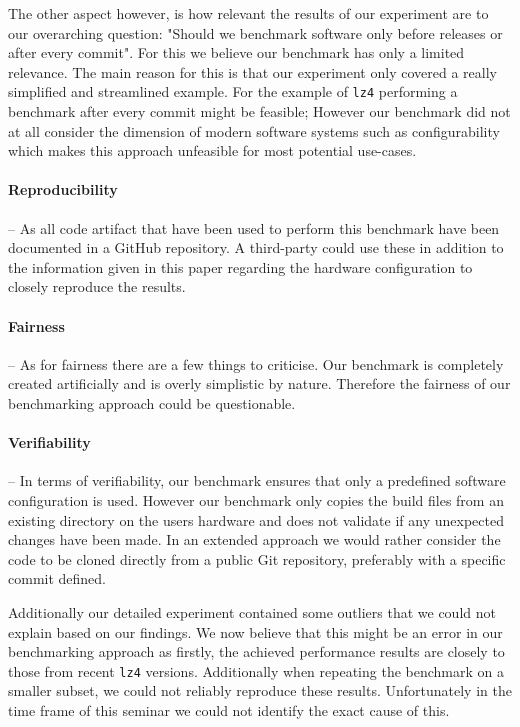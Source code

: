 \documentclass[	runningheads,
				a4paper]{llncs}
\begin{document}
	The other aspect however, is how relevant the results of our experiment are to our overarching question: "Should we benchmark software only before releases or after every commit". For this we believe our benchmark has only a limited relevance. The main reason for this is that our experiment only covered a really simplified and streamlined example. For the example of \texttt{lz4} performing a benchmark after every commit might be feasible; However our benchmark did not at all consider the dimension of modern software systems such as configurability which makes this approach unfeasible for most potential use-cases.

\paragraph{Reproducibility} -- As all code artifact that have been used to perform this benchmark have been documented in a GitHub repository. A third-party could use these in addition to the information given in this paper regarding the hardware configuration to closely reproduce the results.

\paragraph{Fairness} -- As for fairness there are a few things to criticise. Our benchmark is completely created artificially and is overly simplistic by nature. Therefore the fairness of our benchmarking approach could be questionable.

\paragraph{Verifiability} -- In terms of verifiability, our benchmark ensures that only a predefined software configuration is used. However our benchmark only copies the build files from an existing directory on the users hardware and does not validate if any unexpected changes have been made. In an extended approach we would rather consider the code to be cloned directly from a public Git repository, preferably with a specific commit defined.

Additionally our detailed experiment contained some outliers that we could not explain based on our findings. We now believe that this might be an error in our benchmarking approach as firstly, the achieved performance results are closely to those from recent \texttt{lz4} versions. Additionally when repeating the benchmark on a smaller subset, we could not reliably reproduce these results. Unfortunately in the time frame of this seminar we could not identify the exact cause of this.
\end{document}
